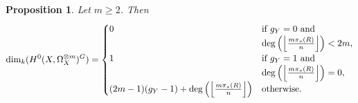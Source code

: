 \documentclass[11pt]{article} %
\newtheorem{prop}{Proposition}
\begin{document}
\begin{prop}\label{prop4}
	Let $m\geq 2$. Then
		\begin{equation*}
			\dim_k(H^0(X,\Omega_{X}^{\otimes m})^G)  =
				\begin{cases}
					0 & \mbox{if } g_Y=0\ \text{and } \\ & \deg\Big(\Big{\lfloor}\frac{m\pi_*(R)}{n}\Big{\rfloor}\Big)<2m,\\
					1 & \mbox{if } g_Y=1\ \text{and } \\ & \deg\Big(\Big{\lfloor}\frac{m\pi_*(R)}{n}\Big{\rfloor}\Big)=0,\\
					(2m-1)(g_Y-1) +\deg\Big(\Big{\lfloor}{\frac{m\pi_* (R)}{n}}\Big{\rfloor}\Big) & \mbox{otherwise}.
				\end{cases}
		\end{equation*}
\end{prop}
\end{document}

